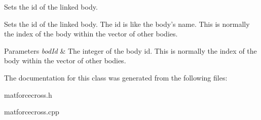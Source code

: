Sets the id of the linked body. 

Sets the id of the linked body. The id is like the body's name. This is normally the index of the body within the vector of other bodies. 
\begin{DoxyParams}{Parameters}
{\em bod\-Id} & The integer of the body id. This is normally the index of the body within the vector of other bodies. \\
\hline
\end{DoxyParams}


The documentation for this class was generated from the following files\-:\begin{DoxyCompactItemize}
\item 
matforcecross.\-h\item 
matforcecross.\-cpp\end{DoxyCompactItemize}
